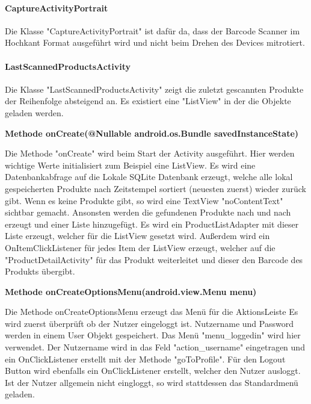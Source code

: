 \documentclass{scrartcl}
\begin{document}
\paragraph{CaptureActivityPortrait}

Die Klasse "CaptureActivityPortrait" ist dafür da, dass der Barcode Scanner im Hochkant Format ausgeführt wird und nicht beim Drehen des Devices mitrotiert. \newline 


\paragraph{LastScannedProductsActivity}

Die Klasse "LastScannedProductsActivity" zeigt die zuletzt gescannten Produkte der Reihenfolge absteigend an. Es existiert eine "ListView" in der die Objekte geladen werden. \newline

\noindent\textbf{Methode onCreate(@Nullable android.os.Bundle savedInstanceState)}

\noindent Die Methode "onCreate" wird beim Start der Activity ausgeführt. Hier werden wichtige Werte initialisiert zum Beispiel eine ListView. Es wird eine Datenbankabfrage auf die Lokale SQLite Datenbank erzeugt, welche alle lokal gespeicherten Produkte nach Zeitstempel sortiert (neuesten zuerst) wieder zurück gibt. Wenn es keine Produkte gibt, so wird eine TextView "noContentText" sichtbar gemacht. Ansonsten werden die gefundenen Produkte nach und nach erzeugt und einer Liste hinzugefügt. Es wird ein ProductListAdapter mit dieser Liste erzeugt, welcher für die ListView gesetzt wird. Außerdem wird ein OnItemClickListener für jedes Item der ListView erzeugt, welcher auf die "ProductDetailActivity" für das Produkt weiterleitet und dieser den Barcode des Produkts übergibt. \newline

\noindent\textbf{Methode onCreateOptionsMenu(android.view.Menu menu)}

\noindent Die Methode onCreateOptionsMenu erzeugt das Menü für die AktionsLeiste Es wird zuerst überprüft ob der Nutzer eingeloggt ist. Nutzername und Password werden in einem User Objekt gespeichert. Das Menü "menu\_loggedin" wird hier verwendet. Der Nutzername wird in das Feld "action\_username" eingetragen und ein OnClickListener erstellt mit der Methode "goToProfile". Für den Logout Button wird ebenfalls ein OnClickListener erstellt, welcher den Nutzer ausloggt. Ist der Nutzer allgemein nicht eingloggt, so wird stattdessen das Standardmenü geladen. \newline
\end{document}

